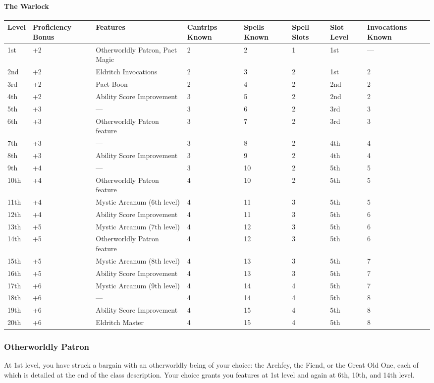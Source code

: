 \documentclass[
]{article}
\begin{document}
\hypertarget{the-warlock}{%
\paragraph{The Warlock}\label{the-warlock}}

\begin{longtable}[]{@{}llllllll@{}}
\toprule
Level & Proficiency Bonus & Features & Cantrips Known & Spells Known &
Spell Slots & Slot Level & Invocations Known\tabularnewline
\midrule
\endhead
1st & +2 & Otherworldly Patron, Pact Magic & 2 & 2 & 1 & 1st &
---\tabularnewline
2nd & +2 & Eldritch Invocations & 2 & 3 & 2 & 1st & 2\tabularnewline
3rd & +2 & Pact Boon & 2 & 4 & 2 & 2nd & 2\tabularnewline
4th & +2 & Ability Score Improvement & 3 & 5 & 2 & 2nd &
2\tabularnewline
5th & +3 & --- & 3 & 6 & 2 & 3rd & 3\tabularnewline
6th & +3 & Otherworldly Patron feature & 3 & 7 & 2 & 3rd &
3\tabularnewline
7th & +3 & --- & 3 & 8 & 2 & 4th & 4\tabularnewline
8th & +3 & Ability Score Improvement & 3 & 9 & 2 & 4th &
4\tabularnewline
9th & +4 & --- & 3 & 10 & 2 & 5th & 5\tabularnewline
10th & +4 & Otherworldly Patron feature & 4 & 10 & 2 & 5th &
5\tabularnewline
11th & +4 & Mystic Arcanum (6th level) & 4 & 11 & 3 & 5th &
5\tabularnewline
12th & +4 & Ability Score Improvement & 4 & 11 & 3 & 5th &
6\tabularnewline
13th & +5 & Mystic Arcanum (7th level) & 4 & 12 & 3 & 5th &
6\tabularnewline
14th & +5 & Otherworldly Patron feature & 4 & 12 & 3 & 5th &
6\tabularnewline
15th & +5 & Mystic Arcanum (8th level) & 4 & 13 & 3 & 5th &
7\tabularnewline
16th & +5 & Ability Score Improvement & 4 & 13 & 3 & 5th &
7\tabularnewline
17th & +6 & Mystic Arcanum (9th level) & 4 & 14 & 4 & 5th &
7\tabularnewline
18th & +6 & --- & 4 & 14 & 4 & 5th & 8\tabularnewline
19th & +6 & Ability Score Improvement & 4 & 15 & 4 & 5th &
8\tabularnewline
20th & +6 & Eldritch Master & 4 & 15 & 4 & 5th & 8\tabularnewline
\bottomrule
\end{longtable}

\hypertarget{otherworldly-patron}{%
\subsubsection{Otherworldly Patron}\label{otherworldly-patron}}

At 1st level, you have struck a bargain with an otherworldly being of
your choice: the Archfey, the Fiend, or the Great Old One, each of which
is detailed at the end of the class description. Your choice grants you
features at 1st level and again at 6th, 10th, and 14th level.
\end{document}

